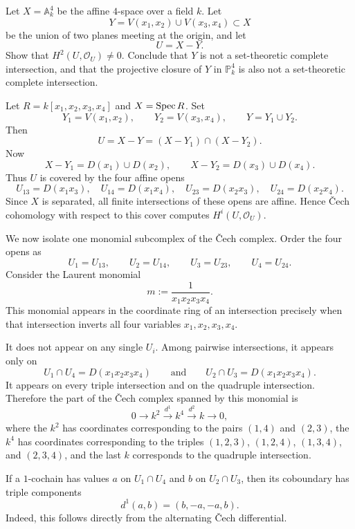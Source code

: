 \documentclass[12pt]{article}
\begin{document}
\begin{exercise}
    Let $X=\mathbb A^4_k$ be the affine $4$-space over a field $k$. Let
    \[Y=V(x_1,x_2)\cup V(x_3,x_4)\subset X\] be the union of two planes meeting at the origin, and let
    \[U=X-Y.\]
    Show that $H^2(U,\mathcal O_U)\neq 0$. Conclude that $Y$ is not a set-theoretic complete intersection, and that the projective closure of $Y$ in $\mathbb P^4_k$ is also not a set-theoretic complete intersection.
\end{exercise}

\begin{solution}
    Let $R=k[x_1,x_2,x_3,x_4]$ and $X=\operatorname{Spec} R$. Set
    \[
        Y_1=V(x_1,x_2),\qquad Y_2=V(x_3,x_4),\qquad Y=Y_1\cup Y_2.
    \]
    Then
    \[
        U=X-Y=(X-Y_1)\cap (X-Y_2).
    \]
    Now
    \[
        X-Y_1=D(x_1)\cup D(x_2),
        \qquad
        X-Y_2=D(x_3)\cup D(x_4).
    \]
    Thus $U$ is covered by the four affine opens
    \[
        U_{13}=D(x_1x_3),\quad
        U_{14}=D(x_1x_4),\quad
        U_{23}=D(x_2x_3),\quad
        U_{24}=D(x_2x_4).
    \]
    Since $X$ is separated, all finite intersections of these opens are affine. Hence \v Cech cohomology with respect to this cover computes $H^i(U,\mathcal O_U)$.

    We now isolate one monomial subcomplex of the \v Cech complex. Order the four opens as
    \[
        U_1=U_{13},\qquad U_2=U_{14},\qquad U_3=U_{23},\qquad U_4=U_{24}.
    \]
    Consider the Laurent monomial
    \[
        m:=\frac{1}{x_1x_2x_3x_4}.
    \]
    This monomial appears in the coordinate ring of an intersection precisely when that intersection inverts all four variables $x_1,x_2,x_3,x_4$.

    It does not appear on any single $U_i$. Among pairwise intersections, it appears only on
    \[
        U_1\cap U_4=D(x_1x_2x_3x_4)
        \qquad\text{and}\qquad
        U_2\cap U_3=D(x_1x_2x_3x_4).
    \]
    It appears on every triple intersection and on the quadruple intersection. Therefore the part of the \v Cech complex spanned by this monomial is
    \[
        0\to k^2\xrightarrow{d^1} k^4\xrightarrow{d^2} k\to 0,
    \]
    where the $k^2$ has coordinates corresponding to the pairs $(1,4)$ and $(2,3)$, the $k^4$ has coordinates corresponding to the triples $(1,2,3)$, $(1,2,4)$, $(1,3,4)$, and $(2,3,4)$, and the last $k$ corresponds to the quadruple intersection.

    If a $1$-cochain has values $a$ on $U_1\cap U_4$ and $b$ on $U_2\cap U_3$, then its coboundary has triple components
    \[
        d^1(a,b)=(b,-a,-a,b).
    \]
    Indeed, this follows directly from the alternating \v Cech differential.


\end{solution}
\end{document}
